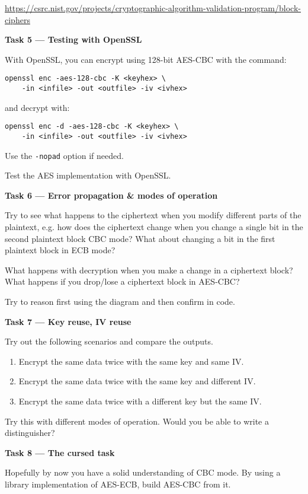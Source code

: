 \documentclass{practice}
\begin{document}
\url{https://csrc.nist.gov/projects/cryptographic-algorithm-validation-program/block-ciphers}

\textbf{Task 5 --- Testing with OpenSSL}

With OpenSSL, you can encrypt using 128-bit AES-CBC with the command:
\begin{verbatim}
openssl enc -aes-128-cbc -K <keyhex> \
    -in <infile> -out <outfile> -iv <ivhex>
\end{verbatim}
and decrypt with:
\begin{verbatim}
openssl enc -d -aes-128-cbc -K <keyhex> \
    -in <infile> -out <outfile> -iv <ivhex>
\end{verbatim}

Use the \texttt{-nopad} option if needed.

Test the AES implementation with OpenSSL.

\textbf{Task 6 --- Error propagation \& modes of operation}

Try to see what happens to the ciphertext when you modify different parts of the plaintext, e.g. how does the ciphertext change when you change a single bit in the second plaintext block CBC mode? What about changing a bit in the first plaintext block in ECB mode?

What happens with decryption when you make a change in a ciphertext block?
What happens if you drop/lose a ciphertext block in AES-CBC?

Try to reason first using the diagram and then confirm in code.

\textbf{Task 7 --- Key reuse, IV reuse}

Try out the following scenarios and compare the outputs.
\begin{enumerate}
  \item Encrypt the same data twice with the same key and same IV.
  \item Encrypt the same data twice with the same key and different IV.
  \item Encrypt the same data twice with a different key but the same IV.
\end{enumerate}

Try this with different modes of operation.
Would you be able to write a distinguisher?

\textbf{Task 8 --- The cursed task}

Hopefully by now you have a solid understanding of CBC mode.
By using a library implementation of AES-ECB, build AES-CBC from it.
\end{document}
